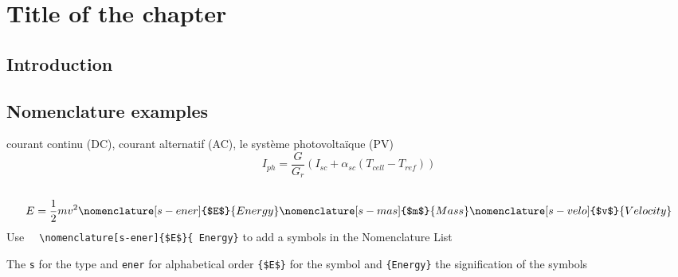\chapter{Title of the chapter}
\section{Introduction}
\blindtext
\section{Nomenclature examples}
courant continu (DC), courant alternatif (AC), le système photovoltaïque (PV) 
\begin{equation}\label{Iph}
I_{ph}=\frac{G}{G_r}\left(I_{sc}+\alpha_{sc}(T_{cell}-T_{ref})\right)
\end{equation}
\\
\begin{equation}
	E=\frac{1}{2}mv^2
	\nomenclature[s-ener]{$E$}{ Energy}
	\nomenclature[s-mas]{$m$}{ Mass}
	\nomenclature[s-velo]{$v$}{ Velocity}
\end{equation}
Use \verb|	\nomenclature[s-ener]{$E$}{ Energy}| to add a  symbols in the Nomenclature List

The \verb|s| for the type and \verb|ener| for alphabetical order
\verb|{$E$}| for the symbol and \verb*|{Energy}| the signification of the symbols

